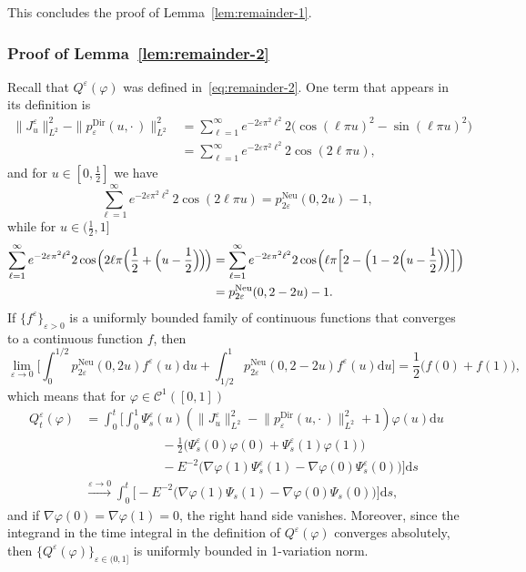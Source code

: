 \documentclass[AHL,Unicode,longabstracts]{cedram}
\DeclareMathOperator{\Dir}{Dir}
\DeclareMathOperator{\Neu}{Neu}
\newcommand{\mc}[1]{{\mathcal #1}}
\renewcommand{\mc}[1]{{\mathcal #1}}
\newcommand*{\dd}{\mathrm{d}}
\newcommand*{\ds}{\dd s}
\newcommand*{\du}{\dd u}
\newcommand*{\Mk}{\mkern -2mu}
\renewcommand{\tfrac}{\frac}
\begin{document}
This concludes the proof of Lemma~\ref{lem:remainder-1}.

\subsubsection{Proof of Lemma~\ref{lem:remainder-2}}

Recall that $Q^{\varepsilon} (\varphi)$ was defined in~\eqref{eq:remainder-2}. One term that appears in its definition is
\begin{align*}
\| J^{\varepsilon}_u \|_{L^2}^2 - \| p^{\Dir}_{\varepsilon} (u, \cdot\,)
\|_{L^2}^2 & = \sum_{\ell = 1}^{\infty} e^{- 2\varepsilon \pi^2 \ell^2} 2
\big(\cos (\ell \pi u)^2 - \sin (\ell \pi u)^2\big) \\
& = \sum_{\ell = 1}^{\infty} e^{-2
\varepsilon \pi^2 \ell^2} 2 \cos (2 \ell \pi u),
\end{align*}
and for $u \in [0, \frac12]$ we have
\[
\sum_{\ell = 1}^{\infty} e^{- 2\varepsilon \pi^2 \ell^2} 2 \cos (2 \ell \pi u) = p^{\Neu}_{2\varepsilon} (0, 2 u) - 1,
\]
while for $u \in (\frac12, 1]$
\begin{align*}
\sum_{\ell = 1}^{\infty} e^{- 2\varepsilon \pi^2 \ell^2} 2 \cos \Mk\Big(2 \ell \pi
\Big(\tfrac12 + \Big(u - \tfrac12\Big)\Mk\Big)\Mk\Big) & = \sum_{\ell = 1}^{\infty} e^{-2 \varepsilon \pi^2
\ell^2} 2 \cos \Mk\Big(\ell \pi \Big[2 - \Big(1 - 2 \Big(u - \tfrac12\Big)\Mk\Big)\Big]\Big)\\
& = p^{\Neu}_{2\varepsilon} (0, 2 - 2 u) - 1.
\end{align*}
If $\{f^{\varepsilon}\}_{\varepsilon>0}$ is a uniformly bounded family of continuous functions that converges to a continuous function $f$, then
\[
\lim_{\varepsilon \rightarrow 0} \bigg[\int_0^{1/2} p^{\Neu}_{2\varepsilon} (0, 2 u) f^{\varepsilon} (u) \du + \int_{1/2}^1 p^{\Neu}_{2\varepsilon} (0, 2 - 2 u) f^{\varepsilon} (u) \du \bigg] =
\frac{1}{2} \big(f (0) + f (1)\big),
\]
which means that for $\varphi \in \mc C^1([0,1])$
\begin{align*}
Q^{\varepsilon}_t (\varphi) & = \int_0^t
\bigg[\int_0^1 \Psi^{\varepsilon}_s (u) \left(\big\| J^{\varepsilon}_u
\big\|_{L^2}^2 - \big\| p^{\Dir}_{\varepsilon} (u, \cdot\,) \big\|_{L^2}^2 + 1\right) \varphi (u) \du \\ & \qquad \qquad \qquad - \frac{1}{2} \big(\Psi^\varepsilon_s (0) \varphi (0) + \Psi^\varepsilon_s (1) \varphi (1)\big) \\
& \qquad \qquad \qquad - E^{- 2} \big(\nabla \varphi (1) \Psi^{\varepsilon}_s (1) -
\nabla \varphi (0) \Psi^{\varepsilon}_s (0)\big) \bigg] \ds\\
& \xrightarrow{\varepsilon \to 0} \int_0^t \Big[- E^{- 2} \big(\nabla \varphi (1) \Psi_s (1) - \nabla \varphi (0) \Psi_s (0)\big)\Big] \ds,
\end{align*}
and if $\nabla \varphi(0) = \nabla \varphi(1) = 0$, the right hand side vanishes. Moreover, since the integrand in the time integral in the definition of $Q^\varepsilon(\varphi)$ converges absolutely, then $\{Q^\varepsilon(\varphi)\}_{\varepsilon \in (0,1]}$ is uniformly bounded in 1-variation norm.
\end{document}
